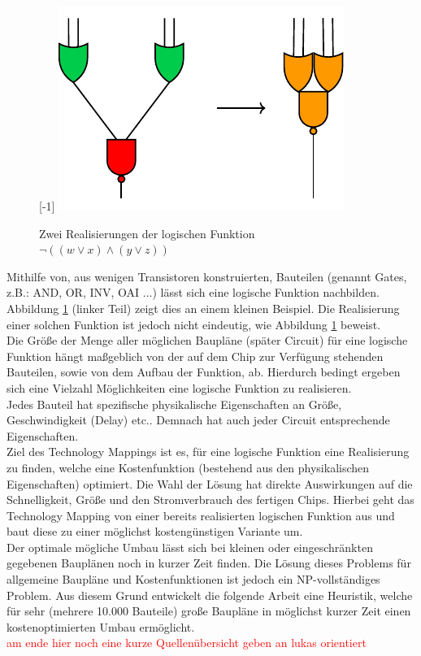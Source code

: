 \documentclass[11pt, a4paper, german]{article}
\newcommand{\TM}{Technology  Mapping }
\begin{document}
\begin{figure}
	\scalebox{1}[-1]{
		\includegraphics[]{pictures/compiled/einfBsp}
	}
		\caption{Zwei Realisierungen der logischen Funktion $\neg((w\lor x) \land (y \lor z))$}
		\label{bild:einfbsp}
\end{figure}
Mithilfe von, aus wenigen Transistoren konstruierten, Bauteilen (genannt Gates, z.B.: AND, OR, INV, OAI ...) lässt sich eine logische Funktion nachbilden. Abbildung \ref{bild:einfbsp} (linker Teil) zeigt dies an einem kleinen Beispiel.  Die Realisierung einer solchen Funktion ist jedoch nicht eindeutig, wie Abbildung \ref{bild:einfbsp}  beweist. \\
Die Größe der Menge aller möglichen Baupläne (später Circuit) für eine logische Funktion hängt maßgeblich von der auf dem Chip zur Verfügung stehenden Bauteilen, sowie von dem Aufbau der Funktion, ab. Hierdurch bedingt ergeben sich eine Vielzahl Möglichkeiten eine logische Funktion zu realisieren.\\
 Jedes Bauteil hat spezifische physikalische Eigenschaften an Größe, Geschwindigkeit (Delay) etc.. Demnach hat auch jeder Circuit entsprechende Eigenschaften. \\
Ziel des Technology Mappings ist es, für eine logische Funktion eine Realisierung zu finden, welche eine Kostenfunktion (bestehend aus den physikalischen Eigenschaften) optimiert. Die Wahl der Lösung hat direkte Auswirkungen auf die  Schnelligkeit, Größe und den Stromverbrauch des fertigen Chips. Hierbei geht das \TM von einer bereits realisierten logischen Funktion aus und baut diese zu einer möglichst kostengünstigen Variante um. \\
Der optimale mögliche Umbau lässt sich bei kleinen oder eingeschränkten gegebenen Bauplänen noch in kurzer Zeit finden. Die Lösung dieses Problems für allgemeine Baupläne und Kostenfunktionen ist jedoch ein NP-vollständiges Problem. Aus diesem Grund entwickelt die folgende Arbeit eine Heuristik, welche für sehr (mehrere 10.000 Bauteile) große Baupläne in möglichst kurzer Zeit einen kostenoptimierten Umbau ermöglicht.\\
\textcolor{red}{am ende hier noch eine kurze Quellenübersicht geben an lukas orientiert}
\end{document}
